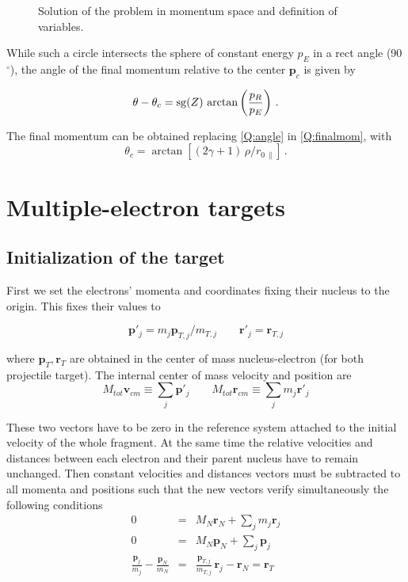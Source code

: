 \begin{figure}%
  \centering
  \caption{Solution of the problem in momentum space and definition of
  variables.
  \label{f:ctmc2}}
\end{figure}

While such a circle intersects the sphere of constant energy $p_{E}$ in
a rect angle (90$^{\circ}$), the angle of the final momentum relative to the
center $\bm{p}_{c}$ is given by

\begin{equation}\label{Q:angle}
\theta - \theta_{c} = {\rm sg}(Z) \, \arctan{\left( \frac{p_{R}}{p_{E}}
\right)} \ .
\end{equation}

The final momentum can be obtained replacing \ref{Q:angle} in
\ref{Q:finalmom}, with
\[
\theta_{c} = \arctan\left[(2 \gamma + 1) \, \rho / r_{0\, \|} \right]
\,.
\]

\section{Multiple-electron targets}

\subsection{Initialization of the target}
\label{S:Initi-targe}

First we set the electrons' momenta and coordinates fixing their
nucleus to the origin. This fixes their values to

\[
\bm{p}'_{j} = m_{j} \bm{p}_{T,j}/m_{T,j} \qquad \bm{r}'_{j} =
\bm{r}_{T,j}
\]

where $\bm{p}_{T}, \bm{r}_{T}$ are obtained in the center of mass
nucleus-electron (for both projectile target). The internal center of
mass velocity and position are
%
\[
M_{tot} \bm{v}_{cm} \equiv \sum_{j} \bm{p}'_{j}  \qquad M_{tot}
\bm{r}_{cm} \equiv \sum_{j} m_{j} \bm{r}'_{j}
\]

These two vectors have to be zero in the reference system attached to
the initial velocity of the whole fragment. At the same time the
relative velocities and distances between each electron and their
parent nucleus have to remain unchanged. Then constant velocities and
distances vectors must be subtracted to all momenta and positions such
that the new vectors verify simultaneously the following conditions
\begin{eqnarray*}
  0 &=& M_{N} \bm{r}_{N} + \sum_{j} m_{j} \bm{r}_{j} \\
  0 &=& M_{N} \bm{p}_{N} + \sum_{j} \bm{p}_{j} \\
\frac{\bm{p}_{j}}{m_{j}} - \frac{\bm{p}_{N}}{m_{N}} &=&
\frac{\bm{p}_{T,j}}{m_{T,j}}\, \bm{r}_{j}-\bm{r}_{N} = \bm{r}_{T}
\end{eqnarray*}

